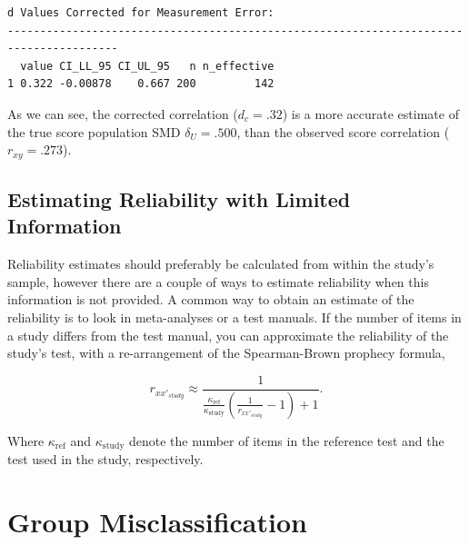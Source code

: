 \documentclass[
  letterpaper,
  DIV=11,
  numbers=noendperiod]{scrreprt}
\newenvironment{Shaded}{\begin{snugshade}}{\end{snugshade}}
\newcommand{\AttributeTok}[1]{\textcolor[rgb]{0.40,0.45,0.13}{#1}}
\newcommand{\CommentTok}[1]{\textcolor[rgb]{0.37,0.37,0.37}{#1}}
\newcommand{\DecValTok}[1]{\textcolor[rgb]{0.68,0.00,0.00}{#1}}
\newcommand{\FunctionTok}[1]{\textcolor[rgb]{0.28,0.35,0.67}{#1}}
\newcommand{\NormalTok}[1]{\textcolor[rgb]{0.00,0.23,0.31}{#1}}
\newcommand{\OtherTok}[1]{\textcolor[rgb]{0.00,0.23,0.31}{#1}}
\newcommand{\SpecialCharTok}[1]{\textcolor[rgb]{0.37,0.37,0.37}{#1}}
\begin{document}
\begin{Shaded}
\end{Shaded}

\begin{verbatim}
d Values Corrected for Measurement Error:
---------------------------------------------------------------------------------------
  value CI_LL_95 CI_UL_95   n n_effective
1 0.322 -0.00878    0.667 200         142
\end{verbatim}

As we can see, the corrected correlation (\(d_c = .32\)) is a more
accurate estimate of the true score population SMD \(\delta_U = .500\),
than the observed score correlation (\(r_{xy}=.273\)).

\hypertarget{sec-lim-information}{%
\section{Estimating Reliability with Limited
Information}\label{sec-lim-information}}

Reliability estimates should preferably be calculated from within the
study's sample, however there are a couple of ways to estimate
reliability when this information is not provided. A common way to
obtain an estimate of the reliability is to look in meta-analyses or a
test manuals. If the number of items in a study differs from the test
manual, you can approximate the reliability of the study's test, with a
re-arrangement of the Spearman-Brown prophecy formula,

\[
r_{xx'_{study}} \approx \frac{1}{\frac{\kappa_{\text{ref}}}{\kappa_{\text{study}}} \left(\frac{1}{r_{xx'_{study}}} - 1\right) + 1}.
\]

Where \(\kappa_{\text{ref}}\) and \(\kappa_{\text{study}}\) denote the
number of items in the reference test and the test used in the study,
respectively.

\hypertarget{group-misclassification}{%
\chapter{Group Misclassification}\label{group-misclassification}}
\end{document}
